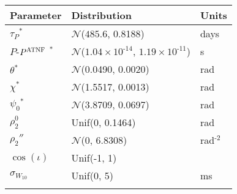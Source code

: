 \begin{tabular}{lll} \hhline{===}
        Parameter & Distribution &  Units\\ \hline
$\tau_{P}$$^{*}$ & $\mathcal{N}$($485.6$, 0.8188) & days\\
$P$\textrm{-}$P^{\tiny\textrm{ATNF}}$
$^{*}$ & $\mathcal{N}$(${1.04}\times 10^{\textrm{-}14}$, ${1.19}\times 10^{\textrm{-}11}$) & s\\
$\theta$$^{*}$ & $\mathcal{N}$(0.0490, 0.0020) & rad\\
$\chi$$^{*}$ & $\mathcal{N}$(1.5517, 0.0013) & rad\\
$\psi_0$$^{*}$ & $\mathcal{N}$(3.8709, 0.0697) & rad\\
$\rho_{2}^{0}$$^{}$ & Unif(0, 0.1464) & rad\\
$\rho_{2}''$$^{}$ & $\mathcal{N}$(0, 6.8308) & rad$^{\textrm{-}2}$\\
$\cos(\iota)$$^{}$ & Unif(\textrm{-}1, 1) & \\
$\sigma_{W_{10}}$$^{}$ & Unif(0, 5) & ms\\
\hhline{===}
\end{tabular}
